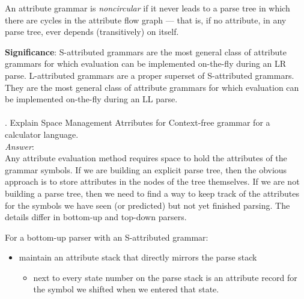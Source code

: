 \documentclass[a4paper,12pt]{article}
\begin{document}
An attribute grammar is \textit{noncircular} if it never leads to a parse tree in which there are cycles in the attribute
flow graph --- that is, if no attribute, in any parse tree, ever depends (transitively) on itself.

\textbf{Significance}:    S-attributed grammars are the most general class of attribute grammars for which evaluation can be implemented on-the-fly during an LR parse. L-attributed grammars are a proper superset of S-attributed grammars. They are the most general class of attribute grammars for which evaluation can be implemented on-the-fly during an LL parse.\\
\\
. Explain Space Management Atrributes for Context-free grammar for a calculator language.\\
\emph{Answer}:\\
Any attribute evaluation method requires space to hold the attributes of the
grammar symbols. If we are building an explicit parse tree, then the obvious approach is to store attributes in the nodes of the tree themselves. If we are not building a parse tree, then we need to find a way to keep track of the attributes
for the symbols we have seen (or predicted) but not yet finished parsing. The details differ in bottom-up and top-down parsers.

For a bottom-up parser with an S-attributed grammar:
\begin{itemize}
\item maintain an attribute stack that directly mirrors the parse stack
\begin{itemize}
\item next to every state number on the parse stack is an attribute record for the symbol we shifted when we entered that state.
\end {itemize}
\end {itemize}
\end{document}
